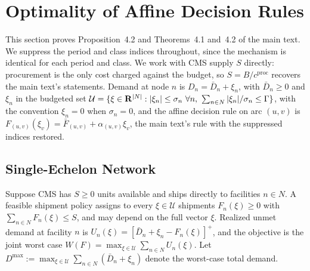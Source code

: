 \documentclass[11pt]{article}
\begin{document}
\section{Optimality of Affine Decision Rules}
\label{ec:exactness}

This section proves Proposition~4.2 and Theorems~4.1 and~4.2 of the main text.
We suppress the period and class indices throughout, since the mechanism is identical for each period and class.
We work with CMS supply $S$ directly: procurement is the only cost charged against the budget, so $S=B/c^{\text{proc}}$ recovers the main text's statements.
Demand at node $n$ is $D_n = \bar D_n + \xi_n$, with $\bar D_n \ge 0$ and $\xi_n$ in the budgeted set $\mathcal{U} = \{ \xi\in{\mathbf R}^{|N|} : |\xi_n|\le\sigma_n\ \forall n,\ \sum_{n\in N}|\xi_n|/\sigma_n\le\Gamma \}$, with the convention $\xi_n = 0$ when $\sigma_n = 0$, and the affine decision rule on arc $(u,v)$ is $F_{(u,v)}(\xi_v) = \bar F_{(u,v)} + \alpha_{(u,v)}\xi_v$, the main text's rule with the suppressed indices restored.

\subsection{Single-Echelon Network}
\label{ec:exactness-single}

Suppose CMS has $S\ge0$ units available and ships directly to facilities $n\in N$.
A feasible shipment policy assigns to every $\xi\in\mathcal{U}$ shipments $F_n(\xi)\ge0$ with $\sum_{n\in N}F_n(\xi)\le S$, and may depend on the full vector $\xi$.
Realized unmet demand at facility $n$ is $U_n(\xi) = [\bar D_n+\xi_n-F_n(\xi)]^+$, and the objective is the joint worst case $W(F) = \max_{\xi\in\mathcal{U}}\sum_{n\in N}U_n(\xi)$.
Let $D^{\max} := \max_{\xi\in\mathcal{U}}\sum_{n\in N}(\bar D_n+\xi_n)$ denote the worst-case total demand.
\end{document}
